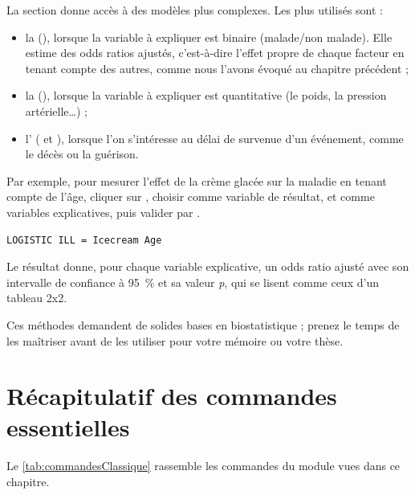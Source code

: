 La section  donne accès à des modèles plus complexes. Les plus utilisés sont :
\begin{itemize}
	\item la  (), lorsque la variable à expliquer est binaire (malade/non malade). Elle estime des odds ratios ajustés, c'est-à-dire l'effet propre de chaque facteur en tenant compte des autres, comme nous l'avons évoqué au chapitre précédent ;
	\item la  (), lorsque la variable à expliquer est quantitative (le poids, la pression artérielle\ldots) ;
	\item l' ( et ), lorsque l'on s'intéresse au délai de survenue d'un événement, comme le décès ou la guérison.
\end{itemize}

Par exemple, pour mesurer l'effet de la crème glacée sur la maladie en tenant compte de l'âge, cliquer sur , choisir  comme variable de résultat,  et  comme variables explicatives, puis valider par .

\begin{tcolorbox}
	\begin{lstlisting}[language=EPIscript, style=mystyle, caption={Régression logistique}, label=lst:logistic]
LOGISTIC ILL = Icecream Age
	\end{lstlisting}
\end{tcolorbox}

Le résultat donne, pour chaque variable explicative, un odds ratio ajusté avec son intervalle de confiance à 95~\% et sa valeur \textit{p}, qui se lisent comme ceux d'un tableau 2x2.

Ces méthodes demandent de solides bases en biostatistique ; prenez le temps de les maîtriser avant de les utiliser pour votre mémoire ou votre thèse.

\section[Récapitulatif des commandes essentielles][Récapitulatif des commandes]{Récapitulatif des commandes essentielles}

Le \autoref{tab:commandesClassique} rassemble les commandes du module  vues dans ce chapitre.


